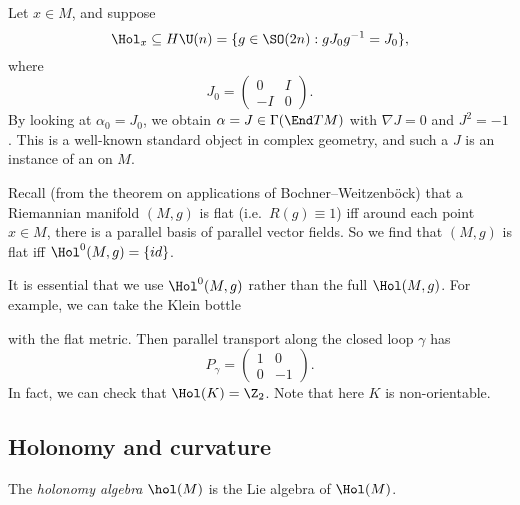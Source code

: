 \documentclass[a4paper]{article}
\begin{document}
\begin{eg}
  Let $x \in M$, and suppose
  \[
    \Hol_x \subseteq H \U(n) = \{g \in \SO(2n): g J_0 g^{-1} = J_0\},
  \]
  where
  \[
    J_0 =
    \begin{pmatrix}
      0 & I\\
      -I & 0
    \end{pmatrix}.
  \]
  By looking at $\alpha_0 = J_0$, we obtain $\alpha = J \in \Gamma(\End TM)$ with $\nabla J = 0$ and $J^2 = -1$. This is a well-known standard object in complex geometry, and such a $J$ is an instance of an  on $M$.
\end{eg}

\begin{eg}
  Recall (from the theorem on applications of Bochner--Weitzenb\"ock) that a Riemannian manifold $(M, g)$ is flat (i.e.\ $R(g) \equiv 1$) iff around each point $x \in M$, there is a parallel basis of parallel vector fields. So we find that $(M, g)$ is flat iff $\Hol^0(M, g) = \{id\}$.

  It is essential that we use $\Hol^0(M, g)$ rather than the full $\Hol(M, g)$. For example, we can take the Klein bottle
  \begin{center}
  \end{center}
  with the flat metric. Then parallel transport along the closed loop $\gamma$ has
  \[
    P_\gamma =
    \begin{pmatrix}
      1 & 0\\
      0 & -1
    \end{pmatrix}.
  \]
  In fact, we can check that $\Hol(K) = \Z_2$. Note that here $K$ is non-orientable.
\end{eg}

\subsection{Holonomy and curvature}

\begin{defi}
  The \emph{holonomy algebra} $\hol(M)$ is the Lie algebra of $\Hol(M)$.
\end{defi}
\end{document}
